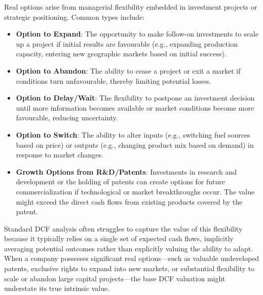 Real options arise from managerial flexibility embedded in investment projects or strategic positioning. Common types include:
\begin{itemize}
    \item \textbf{Option to Expand}: The opportunity to make follow-on investments to scale up a project if initial results are favourable (e.g., expanding production capacity, entering new geographic markets based on initial success).
    \item \textbf{Option to Abandon}: The ability to cease a project or exit a market if conditions turn unfavourable, thereby limiting potential losses.
    \item \textbf{Option to Delay/Wait}: The flexibility to postpone an investment decision until more information becomes available or market conditions become more favourable, reducing uncertainty.
    \item \textbf{Option to Switch}: The ability to alter inputs (e.g., switching fuel sources based on price) or outputs (e.g., changing product mix based on demand) in response to market changes.
    \item \textbf{Growth Options from R\&D/Patents}: Investments in research and development or the holding of patents can create options for future commercialization if technological or market breakthroughs occur. The value might exceed the direct cash flows from existing products covered by the patent.
\end{itemize}

Standard DCF analysis often struggles to capture the value of this flexibility because it typically relies on a single set of expected cash flows, implicitly averaging potential outcomes rather than explicitly valuing the ability to adapt. When a company possesses significant real options—such as valuable undeveloped patents, exclusive rights to expand into new markets, or substantial flexibility to scale or abandon large capital projects—the base DCF valuation might understate its true intrinsic value.

